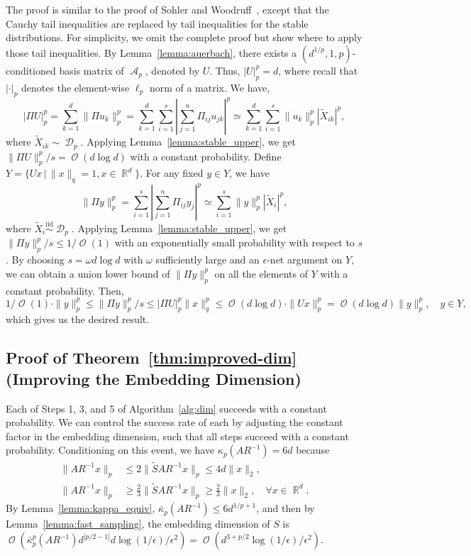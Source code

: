 \documentclass[11pt]{article}
\DeclareMathOperator{\bigO}{\mathcal{O}}
\DeclareMathOperator{\A}{\mathcal{A}}
\DeclareMathOperator{\R}{\mathbb{R}}
\DeclareMathOperator{\D}{\mathcal{D}}
\begin{document}
The proof is similar to the proof of Sohler and Woodruff~\cite[Theorem~5]{SW11},
except that the Cauchy tail inequalities are replaced by tail inequalities for
the stable distributions.
For simplicity, we omit the complete proof but show where to apply those tail
inequalities.
By Lemma~\ref{lemma:auerbach}, there exists a $(d^{1/p}, 1, p)$-conditioned
basis matrix of $\A_p$, denoted by $U$.
Thus, $|U|_p^p = d$, where recall that $|\cdot|_{p}$ denotes the element-wise 
$\ell_{p}$ norm of a matrix.
We have,
\begin{equation*}
  |\Pi U|_p^p = \sum_{k=1}^d \|\Pi u_k\|_p^p 
  = \sum_{k=1}^d \sum_{i=1}^s \left|\sum_{j=1}^n \Pi_{ij} u_{jk}\right|^p 
  \simeq \sum_{k=1}^d \sum_{i=1}^s  \|u_k\|_p^p |\tilde{X}_{ik}|^p,
\end{equation*}
where $\tilde{X}_{ik} \sim \D_p$.
Applying Lemma~\ref{lemma:stable_upper}, we get $\|\Pi U\|_p^p/s = \bigO(d \log
d)$ with a constant probability.
Define $Y = \{ U x \,|\, \|x\|_q = 1, x \in \R^d\}$.
For any fixed $y \in Y$, we have
\begin{equation*}
  \|\Pi y\|_p^p = \sum_{i=1}^s \left| \sum_{j=1}^n \Pi_{ij} y_j\right|^p 
  \simeq \sum_{i=1}^s \|y\|_p^p |\tilde{X}_i|^p,
\end{equation*}
where $\tilde{X}_i \stackrel{\text{iid}}{\sim} \D_p$.
Applying Lemma~\ref{lemma:stable_upper}, we get $\|\Pi y\|_p^p/s \leq
1/\bigO(1)$ with an exponentially small probability with respect to $s$.
By choosing $s = \omega d \log d$ with $\omega$ sufficiently large and an
$\epsilon$-net argument on $Y$, we can obtain a union lower bound of $\|\Pi
y\|_p^p$ on all the elements of $Y$ with a constant probability.
Then,
\begin{equation*}
  1/\bigO(1) \cdot \|y\|_p^p \leq \|\Pi y\|_p^p/s \leq |\Pi U|_p^p \|x\|_q^p 
  \leq \bigO(d \log d) \cdot \|U x\|_p^p = \bigO(d \log d) \|y\|_p^p, \quad y \in Y,
\end{equation*}
which gives us the desired result.


\subsection{Proof of Theorem~\ref{thm:improved-dim} (Improving the Embedding Dimension)}
\label{sxn:pf-imp-dim}

Each of Steps 1, 3, and 5 of Algorithm~\ref{alg:dim} succeeds with a constant
probability.
We can control the success rate of each by adjusting the constant factor in the
embedding dimension, such that all steps succeed with a constant probability.
Conditioning on this event, we have $\kappa_p(A R^{-1}) = 6 d$ because
\begin{align*}
  \|A R^{-1} x\|_p &\leq 2 \|\tilde{S} A R^{-1} x\|_p \leq 4 d \|x\|_2, \\
  \|A R^{-1} x\|_p &\geq \frac{2}{3} \|\tilde{S} A R^{-1} x\|_p 
  \geq \frac{2}{3} \|x\|_2, \quad \forall x \in \R^d.
\end{align*}
By Lemma~\ref{lemma:kappa_equiv}, $\bar{\kappa}_p(A R^{-1}) \leq 6 d^{1/p+1}$, and
then by Lemma~\ref{lemma:fast_sampling}, the embedding dimension of $S$ is
$\bigO( \bar{\kappa}_p^p(A R^{-1}) d^{|p/2-1|} d \log(1/\epsilon) / \epsilon^2 )
= \bigO(d^{3+p/2} \log(1/\epsilon) / \epsilon^2)$.
\end{document}
